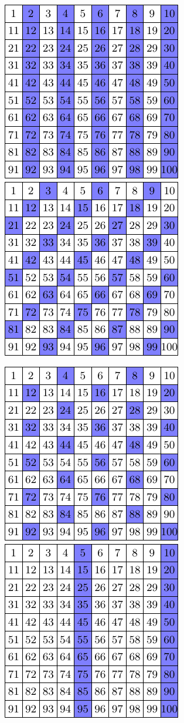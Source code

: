 \documentclass[11pt,a4paper,english]{article}
\begin{document}
\pagestyle{empty}

\begin{center}
	\includegraphics{2} \qquad \qquad
	\includegraphics{3}
\end{center}
\begin{center}
	\includegraphics{4} \qquad \qquad
	\includegraphics{5}
\end{center}
\end{document}
